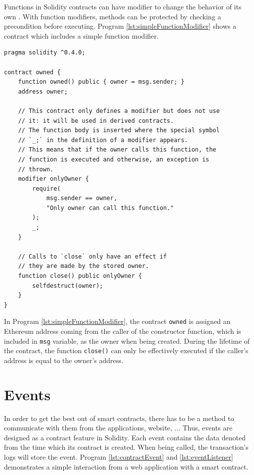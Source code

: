\documentclass[twoside,draftfooter]{tutthesis} %
\begin{document}
Functions in Solidity contracts can have modifier to change the behavior of its own \citep{SolidityDocumentation}. With function modifiers, methods can be protected by checking a precondition before executing. Program \ref{lst:simpleFunctionModifier} shows a contract which includes a simple function modifier.

\begin{lstlisting}[float,caption={Simple function modifier in a contract \citep{SolidityDocumentation}.},label={lst:simpleFunctionModifier},language=Solidity]
pragma solidity ^0.4.0;

contract owned {
    function owned() public { owner = msg.sender; }
    address owner;

    // This contract only defines a modifier but does not use
    // it: it will be used in derived contracts.
    // The function body is inserted where the special symbol
    // `_;` in the definition of a modifier appears.
    // This means that if the owner calls this function, the
    // function is executed and otherwise, an exception is
    // thrown.
    modifier onlyOwner {
        require(
            msg.sender == owner,
            "Only owner can call this function."
        );
        _;
    }
    
    // Calls to `close` only have an effect if
    // they are made by the stored owner.
    function close() public onlyOwner {
        selfdestruct(owner);
    }
}
\end{lstlisting}

In Program \ref{lst:simpleFunctionModifier}, the contract \texttt{owned} is assigned an Ethereum address coming from the caller of the constructor function, which is included in \texttt{msg} variable, as the owner when being created. During the lifetime of the contract, the function \texttt{close()} can only be effectively executed if the caller's address is equal to the owner's address.

\section{Events}

In order to get the best out of smart contracts, there has to be a method to communicate with them from the applications, website, ... Thus, events are designed as a contract feature in Solidity. Each event contains the data denoted from the time which its contract is created. When being called, the transaction's logs will store the event. Program \ref{lst:contractEvent} and \ref{lst:eventListener} demonstrates a simple interaction from a web application with a smart contract.
\end{document}
